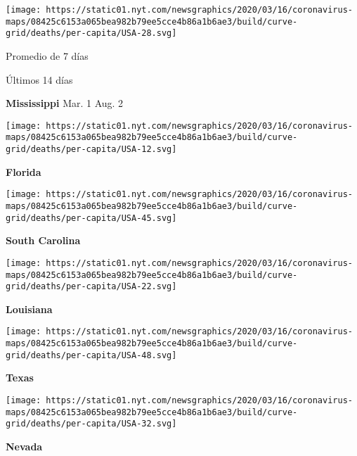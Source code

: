 \href{https://www.nytimes.com/interactive/2020/us/mississippi-coronavirus-cases.html}{}

\texttt{[image: https://static01.nyt.com/newsgraphics/2020/03/16/coronavirus-maps/08425c6153a065bea982b79ee5cce4b86a1b6ae3/build/curve-grid/deaths/per-capita/USA-28.svg]}

Promedio de 7 días

Últimos 14 días

\textbf{Mississippi} Mar. 1 Aug. 2

\href{https://www.nytimes.com/interactive/2020/us/florida-coronavirus-cases.html}{}

\texttt{[image: https://static01.nyt.com/newsgraphics/2020/03/16/coronavirus-maps/08425c6153a065bea982b79ee5cce4b86a1b6ae3/build/curve-grid/deaths/per-capita/USA-12.svg]}

\textbf{Florida}

\href{https://www.nytimes.com/interactive/2020/us/south-carolina-coronavirus-cases.html}{}

\texttt{[image: https://static01.nyt.com/newsgraphics/2020/03/16/coronavirus-maps/08425c6153a065bea982b79ee5cce4b86a1b6ae3/build/curve-grid/deaths/per-capita/USA-45.svg]}

\textbf{South Carolina}

\href{https://www.nytimes.com/interactive/2020/us/louisiana-coronavirus-cases.html}{}

\texttt{[image: https://static01.nyt.com/newsgraphics/2020/03/16/coronavirus-maps/08425c6153a065bea982b79ee5cce4b86a1b6ae3/build/curve-grid/deaths/per-capita/USA-22.svg]}

\textbf{Louisiana}

\href{https://www.nytimes.com/interactive/2020/us/texas-coronavirus-cases.html}{}

\texttt{[image: https://static01.nyt.com/newsgraphics/2020/03/16/coronavirus-maps/08425c6153a065bea982b79ee5cce4b86a1b6ae3/build/curve-grid/deaths/per-capita/USA-48.svg]}

\textbf{Texas}

\href{https://www.nytimes.com/interactive/2020/us/nevada-coronavirus-cases.html}{}

\texttt{[image: https://static01.nyt.com/newsgraphics/2020/03/16/coronavirus-maps/08425c6153a065bea982b79ee5cce4b86a1b6ae3/build/curve-grid/deaths/per-capita/USA-32.svg]}

\textbf{Nevada}

\href{https://www.nytimes.com/interactive/2020/us/georgia-coronavirus-cases.html}{}

